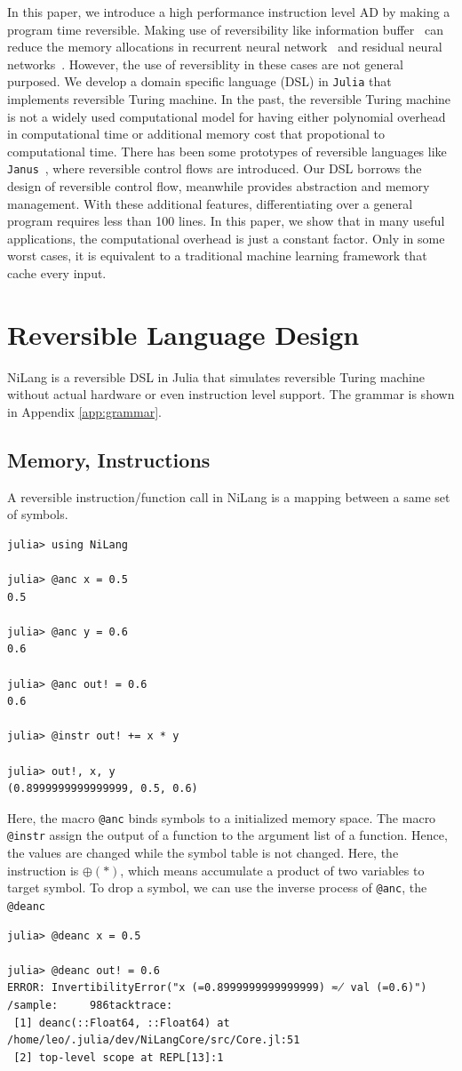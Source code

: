 \documentclass[aps,twocolumn,longbibliography,english,superscriptaddress,prr]{revtex4-1}
\newcommand{\<}{\langle}
\renewcommand{\>}{\rangle}
\newcommand{\App}[1]{Appendix \ref{#1}}
\begin{document}
In this paper, we introduce a high performance instruction level AD by making a program time reversible.
Making use of reversibility like information buffer~\cite{Maclaurin2015} can reduce the memory allocations in recurrent neural network~\cite{MacKay2018} and residual neural networks~\cite{Behrmann2018}. However, the use of reversiblity in these cases are not general purposed.
We develop a domain specific language (DSL) in \texttt{Julia} that implements reversible Turing machine. In the past, the reversible Turing machine is not a widely used computational model for having either polynomial overhead in computational time or additional memory cost that propotional to computational time.
There has been some prototypes of reversible languages like \texttt{Janus}~\cite{Lutz1986}, where reversible control flows are introduced. Our DSL borrows the design of reversible control flow, meanwhile provides abstraction and memory management. With these additional features, differentiating over a general program requires less than 100 lines.
In this paper, we show that in many useful applications, the computational overhead is just a constant factor. Only in some worst cases, it is equivalent to a traditional machine learning framework that cache every input.

\section{Reversible Language Design}
NiLang is a reversible DSL in Julia that simulates reversible Turing machine without actual hardware or even instruction level support. The grammar is shown in \App{app:grammar}.
\subsection{Memory, Instructions}
A reversible instruction/function call in NiLang is a mapping between a same set of symbols.
\begin{lstlisting}
julia> using NiLang

julia> @anc x = 0.5
0.5

julia> @anc y = 0.6
0.6

julia> @anc out! = 0.6
0.6

julia> @instr out! += x * y

julia> out!, x, y
(0.8999999999999999, 0.5, 0.6)
\end{lstlisting}
Here, the macro \texttt{@anc} binds symbols to a initialized memory space. The macro \texttt{@instr} assign the output of a function to the argument list of a function. Hence, the values are changed while the symbol table is not changed. Here, the instruction is $\oplus(*)$, which means accumulate a product of two variables to target symbol.
To drop a symbol, we can use the inverse process of \texttt{@anc}, the \texttt{@deanc}
\begin{lstlisting}
julia> @deanc x = 0.5

julia> @deanc out! = 0.6
ERROR: InvertibilityError("x (=0.8999999999999999) ≂̸ val (=0.6)")
/sample:     986tacktrace:
 [1] deanc(::Float64, ::Float64) at /home/leo/.julia/dev/NiLangCore/src/Core.jl:51
 [2] top-level scope at REPL[13]:1
\end{lstlisting}
\end{document}
